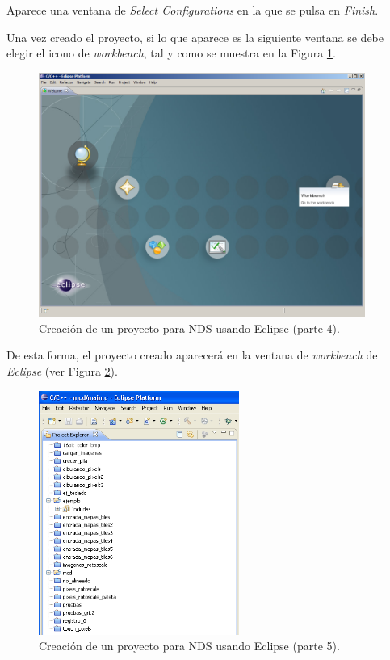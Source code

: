 Aparece una ventana de \textit{Select Configurations} en la que se pulsa en \textit{Finish}. 

Una vez creado el proyecto, si lo que aparece es la siguiente ventana se debe elegir el icono de \textit{workbench}, tal y como se muestra en la Figura \ref{fig_c2_eclipsew}.

\begin{figure}[t]
\centering
\includegraphics[height=8cm]{./Figuras/C2/c2_eclipse-workbench.png}
\caption{Creación de un proyecto para NDS usando Eclipse  (parte 4).}
\label{fig_c2_eclipsew}
\end{figure}

De esta forma, el  proyecto creado aparecerá en la ventana de \textit{workbench} de \textit{Eclipse} (ver Figura \ref{fig_c2_eclipse4}).

\begin{figure}[t]
\centering
\includegraphics[height=8cm]{./Figuras/C2/c2_eclipse4.png}
\caption{Creación de un proyecto para NDS usando Eclipse (parte 5).}
\label{fig_c2_eclipse4}
\end{figure}


